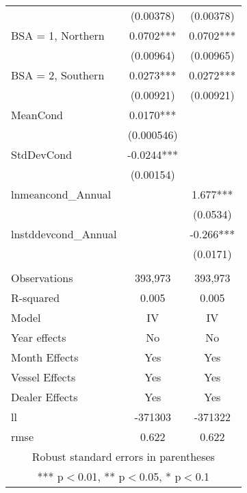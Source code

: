 \begin{tabular}{lcc}
 & (0.00378) & (0.00378) \\
BSA = 1, Northern & 0.0702*** & 0.0702*** \\
 & (0.00964) & (0.00965) \\
BSA = 2, Southern & 0.0273*** & 0.0272*** \\
 & (0.00921) & (0.00921) \\
MeanCond & 0.0170*** &  \\
 & (0.000546) &  \\
StdDevCond & -0.0244*** &  \\
 & (0.00154) &  \\
lnmeancond\_Annual &  & 1.677*** \\
 &  & (0.0534) \\
lnstddevcond\_Annual &  & -0.266*** \\
 &  & (0.0171) \\
 &  &  \\
Observations & 393,973 & 393,973 \\
R-squared & 0.005 & 0.005 \\
Model & IV & IV \\
Year effects & No & No \\
Month Effects & Yes & Yes \\
Vessel Effects & Yes & Yes \\
Dealer Effects & Yes & Yes \\
ll & -371303 & -371322 \\
 rmse & 0.622 & 0.622 \\ \hline
\multicolumn{3}{c}{ Robust standard errors in parentheses} \\
\multicolumn{3}{c}{ *** p$<$0.01, ** p$<$0.05, * p$<$0.1} \\
\end{tabular}
